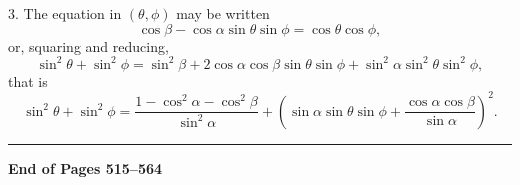 \documentclass[11pt,a4paper]{article}
\theoremstyle{plain}
\theoremstyle{definition}
\theoremstyle{remark}
\begin{document}
3. The equation in $(\theta,\phi)$ may be written
\[
\cos\beta-\cos\alpha\sin\theta\sin\phi=\cos\theta\cos\phi,
\]
or, squaring and reducing,
\[
\sin^{2}\theta+\sin^{2}\phi=\sin^{2}\beta+2\cos\alpha\cos\beta\sin\theta\sin\phi+\sin^{2}\alpha\sin^{2}\theta\sin^{2}\phi,
\]
that is
\[
\sin^{2}\theta+\sin^{2}\phi=\frac{1-\cos^{2}\alpha-\cos^{2}\beta}{\sin^{2}\alpha}+\left(\sin\alpha\sin\theta\sin\phi+\frac{\cos\alpha\cos\beta}{\sin\alpha}\right)^{2}.
\]

\vspace{2em}

\begin{center}
\rule{0.5\textwidth}{0.4pt}
\end{center}

\vspace{1em}

\begin{center}
\textbf{End of Pages 515--564}
\end{center}
\end{document}
